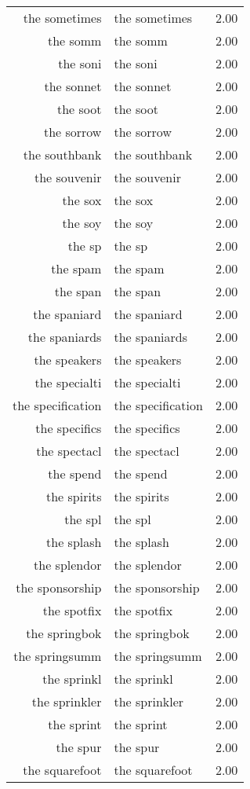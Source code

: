 \begin{table}[ht]
\begin{tabular}{rlr}
  the sometimes & the sometimes & 2.00 \\ 
  the somm & the somm & 2.00 \\ 
  the soni & the soni & 2.00 \\ 
  the sonnet & the sonnet & 2.00 \\ 
  the soot & the soot & 2.00 \\ 
  the sorrow & the sorrow & 2.00 \\ 
  the southbank & the southbank & 2.00 \\ 
  the souvenir & the souvenir & 2.00 \\ 
  the sox & the sox & 2.00 \\ 
  the soy & the soy & 2.00 \\ 
  the sp & the sp & 2.00 \\ 
  the spam & the spam & 2.00 \\ 
  the span & the span & 2.00 \\ 
  the spaniard & the spaniard & 2.00 \\ 
  the spaniards & the spaniards & 2.00 \\ 
  the speakers & the speakers & 2.00 \\ 
  the specialti & the specialti & 2.00 \\ 
  the specification & the specification & 2.00 \\ 
  the specifics & the specifics & 2.00 \\ 
  the spectacl & the spectacl & 2.00 \\ 
  the spend & the spend & 2.00 \\ 
  the spirits & the spirits & 2.00 \\ 
  the spl & the spl & 2.00 \\ 
  the splash & the splash & 2.00 \\ 
  the splendor & the splendor & 2.00 \\ 
  the sponsorship & the sponsorship & 2.00 \\ 
  the spotfix & the spotfix & 2.00 \\ 
  the springbok & the springbok & 2.00 \\ 
  the springsumm & the springsumm & 2.00 \\ 
  the sprinkl & the sprinkl & 2.00 \\ 
  the sprinkler & the sprinkler & 2.00 \\ 
  the sprint & the sprint & 2.00 \\ 
  the spur & the spur & 2.00 \\ 
  the squarefoot & the squarefoot & 2.00 \\ 

\end{tabular}
\end{table}
